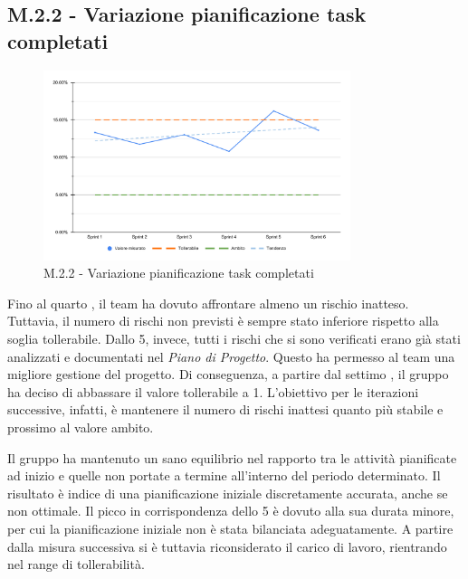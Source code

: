 \subsection{M.2.2 - Variazione pianificazione task completati}
\begin{figure}[H]
    \centering
    \includegraphics[width=0.8\textwidth]{assets/variazione_task_completati.pdf}
    \caption{M.2.2 - Variazione pianificazione task completati}
\end{figure}

\par Fino al quarto , il team ha dovuto affrontare almeno un rischio inatteso.
Tuttavia, il numero di rischi non previsti è sempre stato inferiore rispetto alla soglia tollerabile.
Dallo  5, invece, tutti i rischi che si sono verificati erano già stati analizzati e documentati nel \textit{Piano di Progetto}.
Questo ha permesso al team una migliore gestione del progetto. Di conseguenza, a partire dal settimo ,
il gruppo ha deciso di abbassare il valore tollerabile a 1. L'obiettivo per le iterazioni successive, infatti, è mantenere il numero di rischi
inattesi quanto più stabile e prossimo al valore ambito.

\par Il gruppo ha mantenuto un sano equilibrio nel rapporto tra le attività pianificate ad inizio  e quelle non portate a termine all'interno del periodo determinato. Il risultato è indice di una pianificazione iniziale discretamente accurata, anche se non ottimale. Il picco in corrispondenza dello  5 è dovuto alla sua durata minore, per cui la pianificazione iniziale non è stata bilanciata adeguatamente. A partire dalla misura successiva si è tuttavia riconsiderato il carico di lavoro, rientrando nel range di tollerabilità.